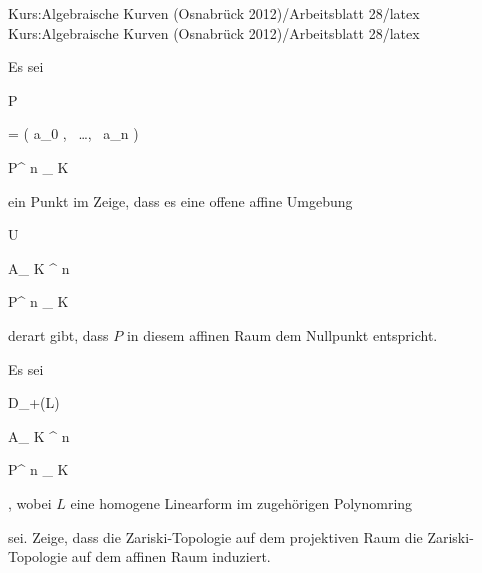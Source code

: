 Kurs:Algebraische Kurven (Osnabrück 2012)/Arbeitsblatt 28/latex
Kurs:Algebraische Kurven (Osnabrück 2012)/Arbeitsblatt 28/latex


\setcounter{section}{28}





{}

{


Es sei


\mavergleichskette

{\vergleichskette

{P
}

{ = }{ \left( a_0   , \,   \ldots  , \,   a_n                 \right)
}

{ \in }{ {\mathbb P}^{ n }_{ K}
}

{    }{
}

{   }{
}

}
{}{}{}
ein Punkt im
Zeige, dass es eine offene affine Umgebung


\mavergleichskette

{\vergleichskette

{U
}

{ \cong }{ { {\mathbb A}_{  K }^{  n   } }
}

{ \subset }{ {\mathbb P}^{ n }_{ K}
}

{    }{
}

{   }{
}

}
{}{}{}
derart gibt, dass $P$ in diesem affinen Raum dem Nullpunkt entspricht.


}

{} {}



{}

{


Es sei


\mavergleichskette

{\vergleichskette

{ D_+(L)
}

{ \cong }{ { {\mathbb A}_{  K }^{  n   } }
}

{ \subseteq }{ {\mathbb P}^{ n }_{ K}
}

{    }{
}

{   }{
}

}
{}{}{,}
wobei $L$ eine homogene Linearform im zugehörigen Polynomring

 sei. Zeige, dass die Zariski-Topologie auf dem projektiven Raum die Zariski-Topologie auf dem affinen Raum induziert.


}

